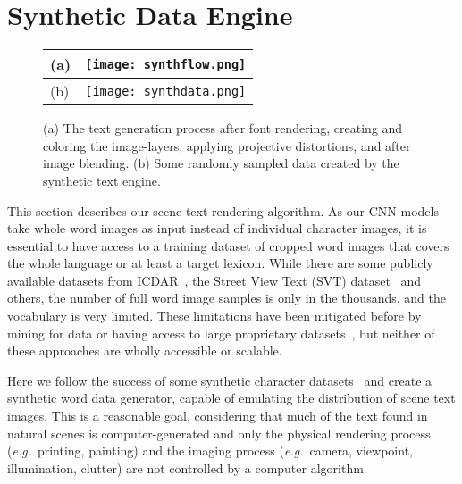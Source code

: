 \documentclass{article} \usepackage{nips14submit_e,times}
\def\eg{\emph{e.g.}}
\begin{document}
\section{Synthetic Data Engine}\label{sec:synth}
\begin{figure}[t]
\centering
\begin{tabular}{>{\centering}m{10pt}m{}}
(a) & \texttt{[image: synthflow.png]}\\
\hline
(b) & \texttt{[image: synthdata.png]}\\
\end{tabular}
\vspace*{-3mm}
\caption{(a) The text generation process after font rendering, creating and coloring the image-layers, applying projective distortions, and after image blending. (b) Some randomly sampled data created by the synthetic text engine.}
\label{fig:synthdata}
\end{figure}

This section describes our scene text rendering algorithm. As our CNN models take whole word images as input instead of individual character images, it is essential to have access to a training dataset of cropped word images that covers the whole language or at least a target lexicon. While there are some publicly available datasets from ICDAR~\cite{ICDAR03, ICDAR2005, ICDAR11, ICDAR2013}, the Street View Text (SVT) dataset~\cite{Wang11} and others, the number of full word image samples is only in the thousands, and the vocabulary is very limited. These limitations have been mitigated before by mining for data or having access to large proprietary datasets~\cite{Jaderberg14a,Bissacco13}, but neither of these approaches are wholly accessible or scalable.



Here we follow the success of some synthetic character datasets~\cite{Campos09,Wang12} and create a synthetic word data generator, capable of emulating the distribution of scene text images. This is a reasonable goal, considering that much of the text found in natural scenes is computer-generated and only the physical rendering process (\eg~printing, painting) and the imaging process (\eg~camera, viewpoint, illumination, clutter) are not controlled by a computer algorithm. 
\end{document}

